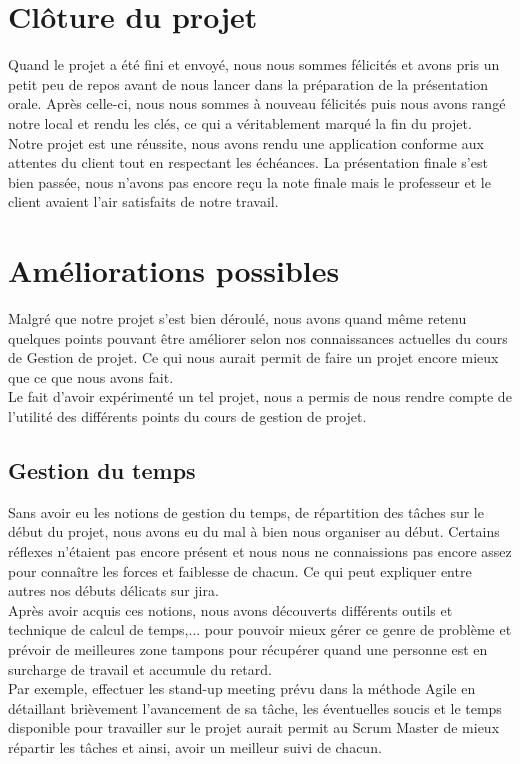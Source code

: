\documentclass[t, 12pt, usenames,dvipsnames]{article}
\begin{document}
    \section{Clôture du projet}
        \noindent Quand le projet a été fini et envoyé, nous nous sommes félicités et avons pris un petit peu de repos avant de nous lancer dans la préparation de la présentation orale. Après celle-ci, nous nous sommes à nouveau félicités puis nous avons rangé notre local et rendu les clés, ce qui a véritablement marqué la fin du projet.\\
        Notre projet est une réussite, nous avons rendu une application conforme aux attentes du client tout en respectant les échéances. La présentation finale s'est bien passée, nous n'avons pas encore reçu la note finale mais le professeur et le client avaient l'air satisfaits de notre travail.\\
        

     \section{Améliorations possibles}
     \noindent Malgré que notre projet s'est bien déroulé, nous avons quand même retenu quelques points pouvant être améliorer selon nos connaissances actuelles du cours de Gestion de projet. Ce qui nous aurait permit de faire un projet encore mieux que ce que nous avons fait. \\
     Le fait d'avoir expérimenté un tel projet, nous a permis de nous rendre compte de l'utilité des différents points du cours de gestion de projet.
     
     
     \subsection{Gestion du temps}
     \noindent Sans avoir eu les notions de gestion du temps, de répartition des tâches sur le début du projet, nous avons eu du mal à bien nous organiser au début. Certains réflexes n'étaient pas encore présent et nous nous ne connaissions pas encore assez pour connaître les forces et faiblesse de chacun. Ce qui peut expliquer entre autres nos débuts délicats sur jira. \\
     Après avoir acquis ces notions, nous avons découverts différents outils et technique de calcul de temps,... pour pouvoir mieux gérer ce genre de problème et prévoir de meilleures zone tampons pour récupérer quand une personne est en surcharge de travail et accumule du retard.
     \\Par exemple, effectuer les stand-up meeting prévu dans la méthode Agile en détaillant brièvement l'avancement de sa tâche, les éventuelles soucis et le temps disponible pour travailler sur le projet aurait permit au Scrum Master de mieux répartir les tâches et ainsi, avoir un meilleur suivi de chacun.
     
\end{document}
